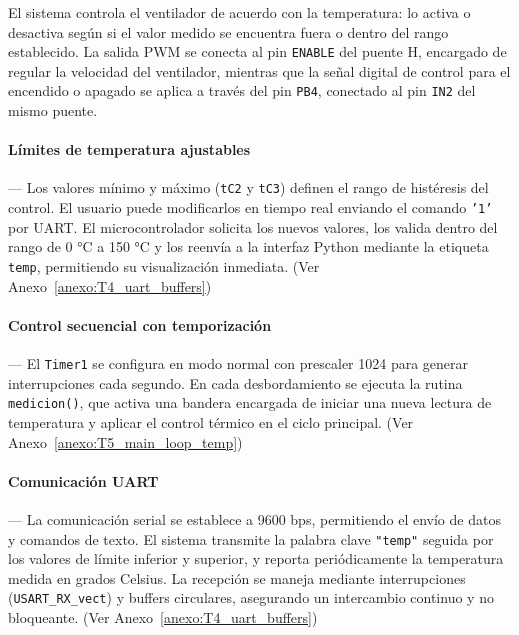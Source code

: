 \vspace{1em}

El sistema controla el ventilador de acuerdo con la temperatura: lo activa o desactiva según si el valor medido se encuentra fuera o dentro del rango establecido. La salida PWM se conecta al pin \texttt{ENABLE} del puente H, encargado de regular la velocidad del ventilador, mientras que la señal digital de control para el encendido o apagado se aplica a través del pin \texttt{PB4}, conectado al pin \texttt{IN2} del mismo puente.

\vspace{1em}

\paragraph*{\textbf{Límites de temperatura ajustables}}---
Los valores mínimo y máximo (\texttt{tC2} y \texttt{tC3}) definen el rango de histéresis del control. El usuario puede modificarlos en tiempo real enviando el comando \texttt{'1'} por UART. El microcontrolador solicita los nuevos valores, los valida dentro del rango de 0 °C a 150 °C y los reenvía a la interfaz Python mediante la etiqueta \texttt{temp}, permitiendo su visualización inmediata. (Ver Anexo~\ref{anexo:T4_uart_buffers})

\vspace{1em}

\paragraph*{\textbf{Control secuencial con temporización}}---
El \texttt{Timer1} se configura en modo normal con prescaler 1024 para generar interrupciones cada segundo. En cada desbordamiento se ejecuta la rutina \texttt{medicion()}, que activa una bandera encargada de iniciar una nueva lectura de temperatura y aplicar el control térmico en el ciclo principal. (Ver Anexo~\ref{anexo:T5_main_loop_temp})

\vspace{1em}

\paragraph*{\textbf{Comunicación UART}}---
La comunicación serial se establece a 9600 bps, permitiendo el envío de datos y comandos de texto. El sistema transmite la palabra clave \texttt{"temp"} seguida por los valores de límite inferior y superior, y reporta periódicamente la temperatura medida en grados Celsius. La recepción se maneja mediante interrupciones (\texttt{USART\_RX\_vect}) y buffers circulares, asegurando un intercambio continuo y no bloqueante. (Ver Anexo~\ref{anexo:T4_uart_buffers})

